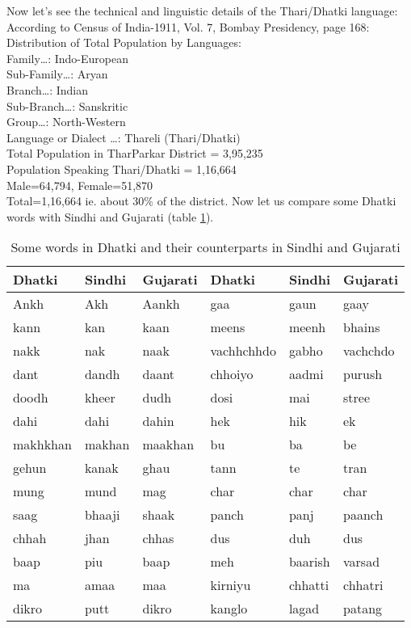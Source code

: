 Now let's see the technical and linguistic details of the Thari/Dhatki language:
According to Census of India-1911, Vol. 7, Bombay Presidency, page 168: Distribution of Total Population by Languages:\\
Family\ldots : Indo-European\\
Sub-Family\ldots : Aryan\\
Branch\ldots : Indian\\
Sub-Branch\ldots : Sanskritic\\
Group\ldots : North-Western\\
Language or Dialect \ldots : Thareli (Thari/Dhatki)\\
Total Population in TharParkar District = 3,95,235\\
Population Speaking Thari/Dhatki = 1,16,664\\
Male=64,794, Female=51,870\\
Total=1,16,664 ie. about 30\% of the district.
Now let us compare some Dhatki words with Sindhi and Gujarati (table \ref{tbl:words}).
\begin{table}
\begin{center}
\begin{tabular}{l|l|l|l|l|l}
\hline
\hline
\textbf{Dhatki} & \textbf{Sindhi} & \textbf{Gujarati} & \textbf{Dhatki} & \textbf{Sindhi} & \textbf{Gujarati} \\
\hline
\hline
Ankh & Akh & Aankh & gaa & gaun & gaay \\
kann & kan & kaan & meens & meenh & bhains \\
nakk & nak & naak & vachhchhdo & gabho & vachchdo \\ 
dant & dandh & daant & chhoiyo & aadmi & purush \\ 
doodh & kheer & dudh & dosi & mai & stree \\ 
dahi & dahi & dahin & hek & hik & ek \\ 
makhkhan & makhan &  maakhan & bu & ba & be \\ 
gehun & kanak & ghau & tann & te & tran \\ 
mung & mund & mag & char & char & char \\ 
saag & bhaaji & shaak & panch & panj & paanch \\ 
chhah & jhan & chhas & dus & duh & dus \\ 
baap & piu & baap & meh & baarish & varsad \\ 
ma & amaa & maa & kirniyu & chhatti & chhatri \\ 
dikro & putt & dikro & kanglo & lagad & patang\\
\hline
\end{tabular}
\end{center}
\label{tbl:words}
\caption{Some words in Dhatki and their counterparts in Sindhi and Gujarati}
\end{table}

